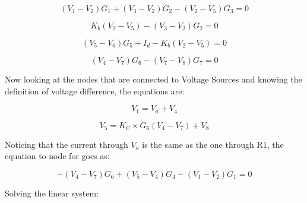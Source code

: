 \begin{equation}
  (V_1-V_2)G_1 + (V_3-V_2)G_2 - (V_2-V_5)G_3 = 0
  \label{eq:Node2}
\end{equation}

\begin{equation}
  K_b(V_2-V_5) - (V_3-V_2)G_2 = 0
  \label{eq:Node3}
\end{equation}

\begin{equation}
  (V_5-V_6)G_5 + I_d - K_b(V_2-V_5) = 0
  \label{eq:Node6}
\end{equation}

\begin{equation}
  (V_4-V_7)G_6 - (V_7-V_8)G_7 = 0
  \label{eq:Node7}
\end{equation}

Now looking at the nodes that are connected to Voltage Sources and knowing the definition of voltage difference, the equations are:

\begin{equation}
  V_1 = V_a + V_4
  \label{eq:Node1}
\end{equation}

\begin{equation}
  V_5= K_C \times G_6(V_4-V_7) + V_8
  \label{eq:Node5}
\end{equation}

Noticing that the current through $V_a$ is the same as the one through R1, the equation to node for goes as:

\begin{equation}
  -(V_4-V_7)G_6 + (V_5-V_4)G_4 - (V_1-V_2)G_1 = 0
  \label{eq:Node5}
\end{equation}

Solving the linear system: 



